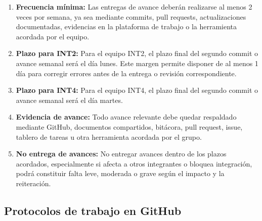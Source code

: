 \documentclass[12pt,a4paper]{article}
\begin{document}
\begin{enumerate}
    \item \textbf{Frecuencia mínima:} Las entregas de avance deberán realizarse al menos 2 veces por semana, ya sea mediante commits, pull requests, actualizaciones documentadas, evidencias en la plataforma de trabajo o la herramienta acordada por el equipo.

    \item \textbf{Plazo para INT2:} Para el equipo INT2, el plazo final del segundo commit o avance semanal será el día lunes. Este margen permite disponer de al menos 1 día para corregir errores antes de la entrega o revisión correspondiente.

    \item \textbf{Plazo para INT4:} Para el equipo INT4, el plazo final del segundo commit o avance semanal será el día martes.

    \item \textbf{Evidencia de avance:} Todo avance relevante debe quedar respaldado mediante GitHub, documentos compartidos, bitácora, pull request, issue, tablero de tareas u otra herramienta acordada por el grupo.

    \item \textbf{No entrega de avances:} No entregar avances dentro de los plazos acordados, especialmente si afecta a otros integrantes o bloquea integración, podrá constituir falta leve, moderada o grave según el impacto y la reiteración.
\end{enumerate}

\subsection{Protocolos de trabajo en GitHub}
\end{document}
